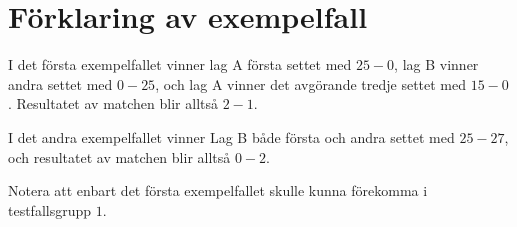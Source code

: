 \section*{Förklaring av exempelfall}
I det första exempelfallet vinner lag A första settet med $25-0$,
lag B vinner andra settet med $0-25$, och lag A vinner det avgörande
tredje settet med $15-0$.
Resultatet av matchen blir alltså $2-1$.

I det andra exempelfallet vinner Lag B både första och andra settet med $25-27$, och resultatet av matchen blir alltså $0-2$.

Notera att enbart det första exempelfallet skulle kunna förekomma i testfallsgrupp $1$.
